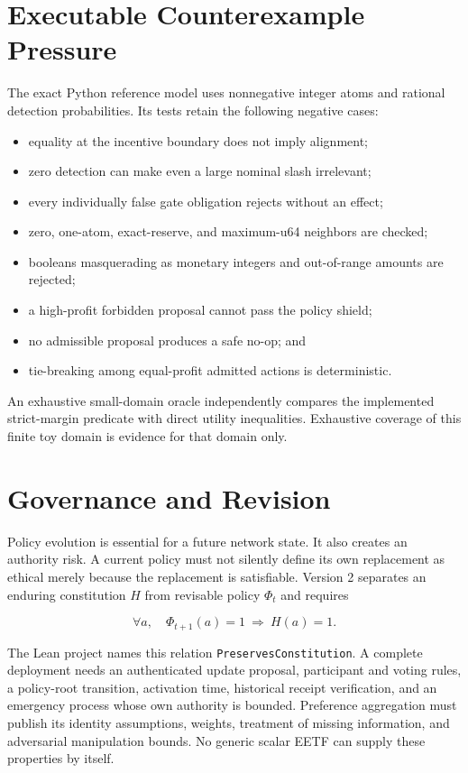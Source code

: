 \documentclass[11pt]{article}
\begin{document}
\section{Executable Counterexample Pressure}

The exact Python reference model uses nonnegative integer atoms and rational
detection probabilities.  Its tests retain the following negative cases:

\begin{itemize}
  \item equality at the incentive boundary does not imply alignment;
  \item zero detection can make even a large nominal slash irrelevant;
  \item every individually false gate obligation rejects without an effect;
  \item zero, one-atom, exact-reserve, and maximum-u64 neighbors are checked;
  \item booleans masquerading as monetary integers and out-of-range amounts are
  rejected;
  \item a high-profit forbidden proposal cannot pass the policy shield;
  \item no admissible proposal produces a safe no-op; and
  \item tie-breaking among equal-profit admitted actions is deterministic.
\end{itemize}

An exhaustive small-domain oracle independently compares the implemented
strict-margin predicate with direct utility inequalities.  Exhaustive coverage
of this finite toy domain is evidence for that domain only.

\section{Governance and Revision}

Policy evolution is essential for a future network state.  It also creates an
authority risk.  A current policy must not silently define its own replacement
as ethical merely because the replacement is satisfiable.  Version 2 separates
an enduring constitution $H$ from revisable policy $\Phi_t$ and requires

\[
  \forall a,\quad \Phi_{t+1}(a)=1\ \Longrightarrow\ H(a)=1.
\]

The Lean project names this relation
\texttt{PreservesConstitution}.  A complete deployment needs an authenticated
update proposal, participant and voting rules, a policy-root transition,
activation time, historical receipt verification, and an emergency process
whose own authority is bounded.  Preference aggregation must publish its
identity assumptions, weights, treatment of missing information, and adversarial
manipulation bounds.  No generic scalar EETF can supply these properties by
itself.
\end{document}

